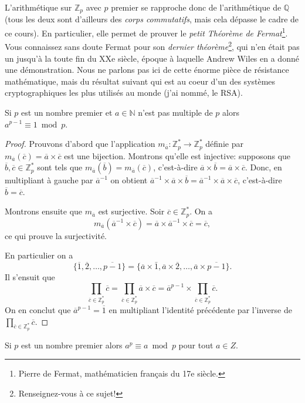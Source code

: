 \documentclass[french,course,oneside,theoremnosection]{lecture}
\newcommand{\N}{\mathbb{N}}
\newcommand{\Z}{\mathbb{Z}}
\newcommand{\Q}{\mathbb{Q}}
\begin{document}
L'arithmétique sur $\Z_p$ avec $p$ premier se rapproche donc de l'arithmétique de $\Q$ (tous les deux sont d'ailleurs des \emph{corps commutatifs}, mais cela dépasse le cadre de ce cours). En particulier, elle permet de prouver le \emph{petit Théorème de Fermat}\footnote{Pierre de Fermat, mathématicien français du 17e siècle.}. Vous connaissez sans doute Fermat pour son \emph{dernier théorème}\footnote{Renseignez-vous à ce sujet!}, qui n'en était pas un jusqu'à la toute fin du XXe siècle, époque à laquelle Andrew Wiles en a donné une démonstration. Nous ne parlons pas ici de cette énorme pièce de résistance mathématique, mais du résultat suivant qui est au coeur d'un des systèmes cryptographiques les plus utilisés au monde (j'ai nommé, le RSA).
\begin{theorem}
Si $p$ est un nombre premier et $a\in \N$ n'est pas multiple de $p$ alors $a^{p-1} \equiv 1 \bmod p$.
\end{theorem}
\begin{proof}
Prouvons d'abord que l'application $m_{\overline{a}}\colon \Z_p^* \to \Z_p^*$ définie par $m_{\overline{a}}(\overline{c})=\overline{a}\times \overline{c}$ est une bijection. Montrons qu'elle est injective: supposons que $\overline{b},\overline{c} \in \Z_p^*$ sont tels que $m_{\overline{a}}(\overline{b})=m_{\overline{a}}(\overline{c})$, c'est-à-dire $\overline{a}\times \overline{b} = \overline{a} \times \overline{c}$. Donc, en multipliant à gauche par $\overline{a}^{-1}$ on obtient $\overline{a}^{-1}\times \overline{a}\times \overline{b} = \overline{a}^{-1} \times \overline{a} \times \overline{c}$, c'est-à-dire $\overline{b}=\overline{c}$.

Montrons ensuite que $m_{\overline{a}}$ est surjective. Soir $\overline{c}\in \Z_p^*$. On a 
\[
m_{\overline{a}}(\overline{a}^{-1} \times \overline{c})= \overline{a}\times \overline{a}^{-1} \times \overline{c}=\overline{c},
\]
ce qui prouve la surjectivité.

En particulier on a
\[
\{\overline{1}, \overline{2}, \ldots, \overline{p-1}\} = \{\overline{a}\times\bar{1}, \overline{a}\times\overline{2}, \ldots, \overline{a}\times\overline{p-1}\}.
\]
Il s'ensuit que 
\[
\prod_{\overline{c} \in \Z_p^*} \overline{c} = \prod_{\overline{c} \in \Z_p^*} \overline{a}\times \overline{c} = \overline{a}^{p-1}\times  \prod_{\overline{c} \in \Z_p^*}  \overline{c}.
\]
On en conclut que $\overline{a}^{p-1} =\overline{1}$ en multipliant l'identité précédente par l'inverse de $\prod_{\overline{c} \in \Z_p^*}  \overline{c}$.
\end{proof}
\begin{corollary}
Si $p$ est un nombre premier alors $a^p\equiv a \bmod p$ pour tout $a\in Z$.
\end{corollary}
\end{document}
